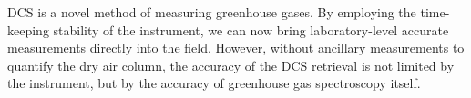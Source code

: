 \documentclass[amt, manuscript]{copernicus}
\begin{document}
DCS is a novel method of measuring greenhouse gases. By employing the time-keeping stability of the instrument, we can now bring laboratory-level accurate measurements directly into the field. However, without ancillary measurements to quantify the dry air column, the accuracy of the DCS retrieval is not limited by the instrument, but by the accuracy of greenhouse gas spectroscopy itself.











\appendix
\section{}    %

\subsection{}     %


\noappendix       %



\end{document}
